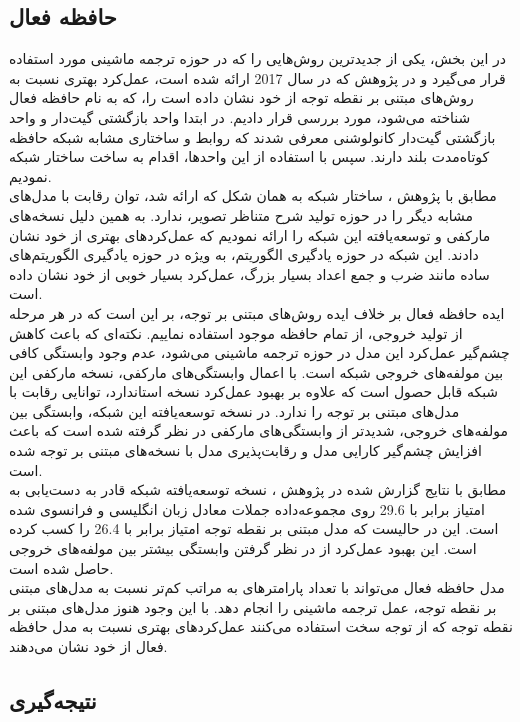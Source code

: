 \subsection{حافظه فعال}
در این بخش، یکی از جدید‌ترین روش‌هایی را که در حوزه ترجمه ماشینی مورد استفاده قرار می‌گیرد و در پژوهش \cite{lukas2017can} که در سال 2017 ارائه شده است، عمل‌کرد بهتری نسبت به روش‌های مبتنی بر نقطه توجه از خود نشان داده است را، که به نام حافظه فعال شناخته می‌شود، مورد بررسی قرار دادیم.  در ابتدا واحد بازگشتی‌ گیت‌دار و واحد بازگشتی گیت‌دار کانولوشنی معرفی شدند که روابط و ساختاری مشابه شبکه حافظه کوتاه‌مدت بلند دارند. سپس با استفاده از این واحد‌ها، اقدام به ساخت ساختار شبکه  نمودیم.
\\
مطابق با پژوهش \cite{lukas2017can}، ساختار شبکه  به همان شکل که ارائه شد، توان رقابت با مدل‌های مشابه دیگر را در حوزه تولید شرح متناظر تصویر، ندارد. به همین دلیل نسخه‌های مارکفی و توسعه‌یافته این شبکه را ارائه نمودیم که عمل‌کردهای بهتری از خود نشان دادند. این شبکه در حوزه یادگیری الگوریتم‌، به ويژه در حوزه یادگیری الگوریتم‌های ساده مانند ضرب و جمع اعداد بسیار بزرگ، عمل‌کرد بسیار خوبی  از خود نشان داده است.
\\
ایده حافظه فعال بر خلاف ایده روش‌های مبتنی بر توجه، بر این است که در هر مرحله از تولید خروجی، از تمام حافظه موجود استفاده نماییم. نکته‌ای که باعث کاهش چشم‌گیر عمل‌کرد این مدل در حوزه ترجمه ماشینی می‌شود، عدم وجود وابستگی کافی بین مولفه‌های خروجی شبکه است. با اعمال وابستگی‌های مارکفی، نسخه مارکفی این شبکه قابل حصول است که علاوه بر بهبود عمل‌کرد نسخه استاندارد، توانایی رقابت با مدل‌های مبتنی بر توجه را ندارد. در نسخه توسعه‌یافته این شبکه، وابستگی بین مولفه‌های خروجی، شدیدتر از وابستگی‌های مارکفی در نظر گرفته شده است که باعث افزایش چشم‌گیر کارایی مدل و رقابت‌پذیری مدل با نسخه‌های مبتنی بر توجه شده است. 
\\
مطابق با نتایج گزارش شده در پژوهش \cite{lukas2017can}، نسخه توسعه‌یافته شبکه قادر به دست‌یابی به امتیاز  برابر با 29.6 روی مجموعه‌داده جملات معادل زبان انگلیسی و فرانسوی شده است. این در حالیست که مدل مبتنی بر نقطه توجه امتیاز  برابر با 26.4 را کسب کرده است. این بهبود عمل‌کرد از در نظر گرفتن وابستگی بیشتر بین مولفه‌های خروجی حاصل شده است.
\\
مدل حافظه فعال می‌تواند با تعداد پارامترهای به مراتب کم‌تر نسبت به مدل‌های مبتنی بر نقطه توجه، عمل ترجمه ماشینی را انجام دهد. با این وجود هنوز مدل‌های مبتنی بر نقطه توجه که از توجه سخت استفاده می‌کنند عمل‌کرد‌های بهتری نسبت به مدل‌ حافظه فعال از خود نشان می‌دهند. 

\subsection{نتیجه‌گیری}

